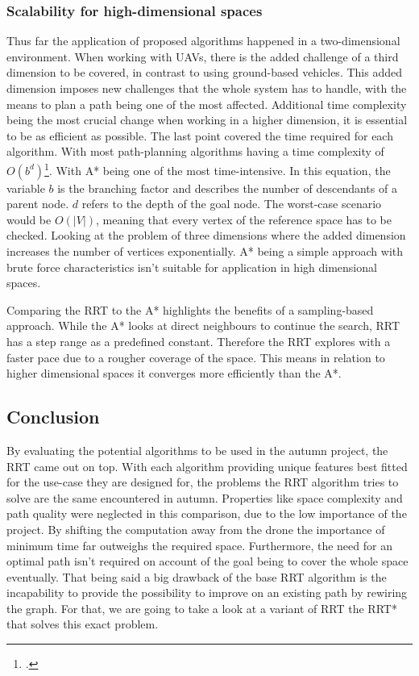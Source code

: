 \subsubsection{Scalability for high-dimensional spaces}

Thus far the application of proposed algorithms happened in a two-dimensional environment. When working with UAVs, there is the added challenge of a third dimension to be covered, in contrast to using ground-based vehicles. This added dimension imposes new challenges that the whole system has to handle, with the means to plan a path being one of the most affected.
Additional time complexity being the most crucial change when working in a higher dimension, it is essential to be as efficient as possible. The last point covered the time required for each algorithm. With most path-planning algorithms having a time complexity of \(O\left(b^d\right)\)\footcite{stackexchangeAstarTimeComplexity2019}. With A* being one of the most time-intensive.
In this equation, the variable $b$ is the branching factor and describes the number of descendants of a parent node. $d$ refers to the depth of the goal node. The worst-case scenario would be \(O\left(|V|\right)\), meaning that every vertex of the reference space has to be checked. Looking at the problem of three dimensions where the added dimension increases the number of vertices exponentially. A* being a simple approach with brute force characteristics isn't suitable for application in high dimensional spaces. 

Comparing the RRT to the A* highlights the benefits of a sampling-based approach. While the A* looks at direct neighbours to continue the search, RRT has a step range as a predefined constant. Therefore the RRT explores with a faster pace due to a rougher coverage of the space. This means in relation to higher dimensional spaces it converges more efficiently than the A*.

\subsection{Conclusion}

By evaluating the potential algorithms to be used in the autumn project, the RRT came out on top. With each algorithm providing unique features best fitted for the use-case they are designed for, the problems the RRT algorithm tries to solve are the same encountered in autumn. Properties like space complexity and path quality were neglected in this comparison, due to the low importance of the project. By shifting the computation away from the drone the importance of minimum time far outweighs the required space. Furthermore, the need for an optimal path isn't required on account of the goal being to cover the whole space eventually. That being said a big drawback of the base RRT algorithm is the incapability to provide the possibility to improve on an existing path by rewiring the graph. For that, we are going to take a look at a variant of RRT the RRT* that solves this exact problem.


